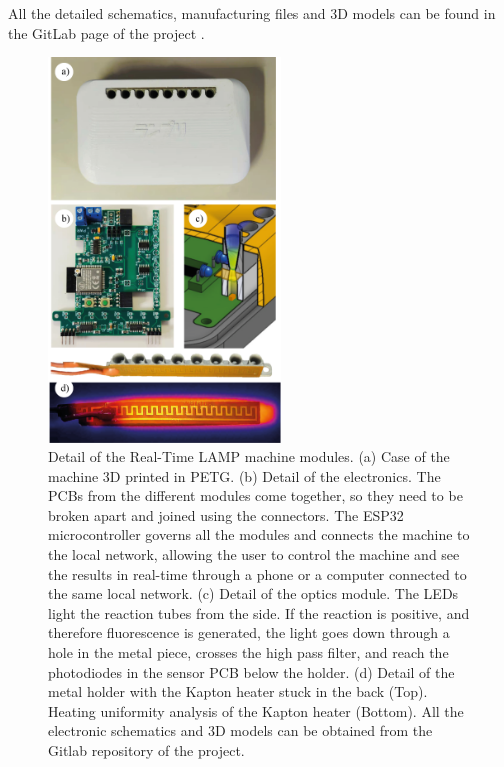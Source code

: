 All the detailed schematics, manufacturing files and 3D models can be found in the GitLab page of the project \cite{francisco_javier_quero_lombardero_open_2021}.

\newpage
\null
\vfill
\begin{figure}[h]
    \centering
    \includegraphics[width=0.55\textwidth,keepaspectratio]{figures/qLAMP-parts.png}
    \caption{Detail of the Real-Time LAMP machine modules. (a) Case of the machine 3D printed in PETG. (b) Detail of the electronics. The PCBs from the different modules come together, so they need to be broken apart and joined using the connectors. The ESP32 microcontroller governs all the modules and connects the machine to the local network, allowing the user to control the machine and see the results in real-time through a phone or a computer connected to the same local network. (c) Detail of the optics module. The LEDs light the reaction tubes from the side. If the reaction is positive, and therefore fluorescence is generated, the light goes down through a hole in the metal piece, crosses the high pass filter, and reach the photodiodes in the sensor PCB below the holder. (d) Detail of the metal holder with the Kapton heater stuck in the back (Top). Heating uniformity analysis of the Kapton heater (Bottom). All the electronic schematics and 3D models can be obtained from the Gitlab repository of the project\cite{francisco_javier_quero_lombardero_open_2021}.}
    \label{qLamp parts}
\end{figure}
\vfill


